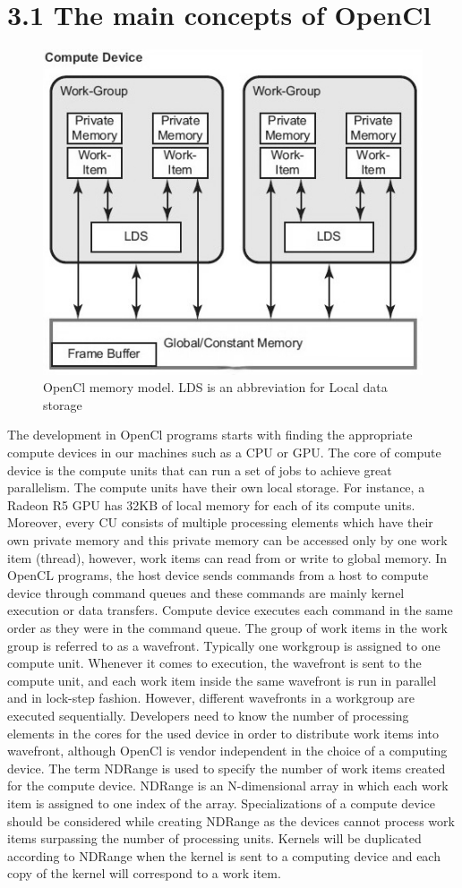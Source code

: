 \documentclass[times]{TRR}
\begin{document}
\section{3.1 The main concepts of OpenCl} 
\begin{figure}[h]
    \includegraphics[scale=0.45]{images/memory-model-opencl.png}
    \caption{OpenCl memory model. LDS is an abbreviation for Local data storage}
\end{figure}
The development in OpenCl programs starts with finding the appropriate compute devices in our machines such as a CPU or GPU. The core of compute device is the compute units that can run a set of jobs to achieve great parallelism. The compute units have their own local storage. For instance, a Radeon R5 GPU has 32KB of local memory for each of its compute units. Moreover, every CU consists of multiple processing elements which have their own private memory and this private memory can be accessed only by one work item (thread), however, work items can read from or write to global memory. In OpenCL programs, the host device sends commands from a host to compute device through command queues and these commands are mainly kernel execution or data transfers. Compute device executes each command in the same order as they were in the command queue. The group of work items in the work group is referred to as a wavefront. Typically one workgroup is assigned to one compute unit. Whenever it comes to execution, the wavefront is sent to the compute unit, and each work item inside the same wavefront is run in parallel and in lock-step fashion. However, different wavefronts in a workgroup are executed sequentially. Developers need to know the number of processing elements in the cores for the used device in order to distribute work items into wavefront, although OpenCl is vendor independent in the choice of a computing device. The term NDRange is used to specify the number of work items created for the compute device. NDRange is an N-dimensional array in which each work item is assigned to one index of the array. Specializations of a compute device should be considered while creating NDRange as the devices cannot process work items surpassing the number of processing units. Kernels will be duplicated according to NDRange when the kernel is sent to a computing device and each copy of the kernel will correspond to a work item.
\end{document}
